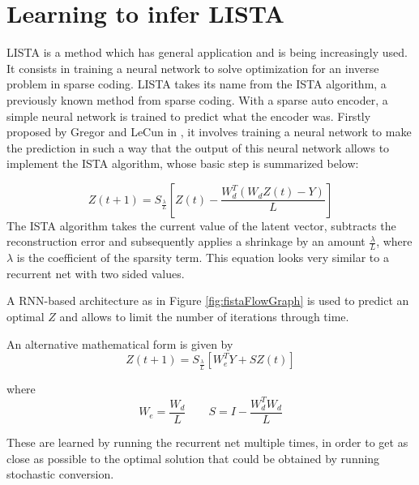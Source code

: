 

\section{Learning to infer LISTA}

LISTA is a method which has general application and is being increasingly used. It consists in training a neural network to solve optimization for an inverse problem in sparse coding. 
LISTA takes its name from the ISTA algorithm, a previously known method from sparse coding.
With a sparse auto encoder, a simple neural network is trained to predict what the encoder was. Firstly proposed by Gregor and LeCun in \cite{gregor2010learning}, it involves training a neural network to make the prediction in such a way that the output of this neural network allows to implement the ISTA algorithm, whose basic step is summarized below:

\[
Z(t+1) = S_{\frac{\lambda}{L}}[Z(t) - \frac{W_d ^ T (W_d Z(t) - Y)}{L}] 
\]
The ISTA algorithm takes the current value of the latent vector, subtracts the reconstruction error and subsequently applies a shrinkage by an amount $\frac{\lambda}{L}$, where $\lambda$ is the coefficient of the sparsity term. This equation looks very similar to a recurrent net with two sided values.

A RNN-based architecture as in Figure \ref{fig:fistaFlowGraph} is used to predict an optimal $Z$ and allows to limit the number of iterations through time.

An alternative mathematical form is given by
\[Z(t+1) = S_{\frac{\lambda}{L}}[W_e ^T Y + SZ(t)]\]

where
\[W_e = \frac{W_d}{L} \quad\quad S = I - \frac{ W_d ^T W_d}{L}\]

These are learned by running the recurrent net multiple times, in order to get as close as possible to the optimal solution that could be obtained by running stochastic conversion.


